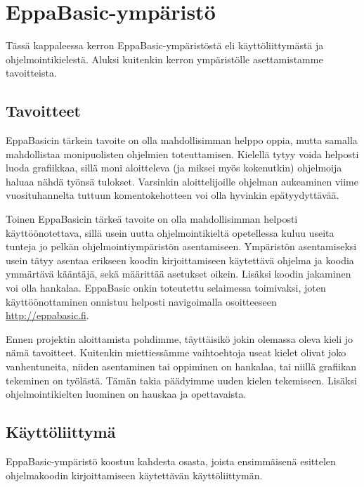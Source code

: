 \section{EppaBasic-ympäristö}
Tässä kappaleessa kerron EppaBasic-ympäristöstä
eli käyttöliittymästä ja ohjelmointikielestä.
Aluksi kuitenkin kerron ympäristölle
asettamistamme tavoitteista.

\subsection{Tavoitteet}
EppaBasicin tärkein tavoite on olla
mahdollisimman helppo oppia,
mutta samalla mahdollistaa
monipuolisten ohjelmien toteuttamisen.
Kielellä tytyy voida helposti luoda grafiikkaa,
sillä moni aloitteleva (ja miksei myös kokenutkin)
ohjelmoija haluaa nähdä työnsä tulokset.
Varsinkin aloittelijoille ohjelman aukeaminen
viime vuosituhannelta tuttuun komentokehotteen
voi olla hyvinkin epätyydyttävää.

Toinen EppaBasicin tärkeä tavoite on olla
mahdollisimman helposti käyttöönotettava,
sillä usein uutta ohjelmointikieltä opetellessa
kuluu useita tunteja jo pelkän
ohjelmointiympäristön asentamiseen.
Ympäristön asentamiseksi usein
tätyy asentaa erikseen koodin
kirjoittamiseen käytettävä ohjelma
ja koodia ymmärtävä kääntäjä,
sekä määrittää asetukset oikein.
Lisäksi koodin jakaminen
voi olla hankalaa.
EppaBasic onkin toteutettu
selaimessa toimivaksi, joten
käyttöönottaminen onnistuu
helposti navigoimalla osoitteeseen
\url{http://eppabasic.fi}.

Ennen projektin aloittamista pohdimme,
täyttäisikö jokin olemassa oleva
kieli jo nämä tavoitteet.
Kuitenkin miettiessämme vaihtoehtoja
useat kielet olivat joko vanhentuneita,
niiden asentaminen tai oppiminen on hankalaa,
tai niillä grafiikan tekeminen on työlästä.
Tämän takia päädyimme uuden kielen tekemiseen.
Lisäksi ohjelmointikielten luominen on hauskaa
ja opettavaista.

\subsection{Käyttöliittymä}
EppaBasic-ympäristö koostuu kahdesta osasta,
joista ensimmäisenä esittelen ohjelmakoodin
kirjoittamiseen käytettävän käyttöliittymän.


